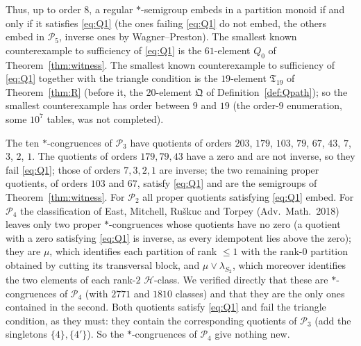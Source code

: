 \documentclass[11pt]{amsart}
\theoremstyle{definition}
\newcommand{\Hh}{\mathcal{H}}
\renewcommand{\P}{\mathcal{P}}
\begin{document}
Thus, up to order $8$, a regular $*$-semigroup embeds in a partition monoid if and only if it satisfies \eqref{eq:Q1} (the ones failing \eqref{eq:Q1} do not embed, the others embed in $\P_5$, inverse ones by Wagner--Preston). The smallest known counterexample to sufficiency of \eqref{eq:Q1} is the $61$-element $Q_0$ of Theorem~\ref{thm:witness}. The smallest known counterexample to sufficiency of \eqref{eq:Q1} together with the triangle condition is the $19$-element $\mathfrak T_{19}$ of Theorem~\ref{thm:R} (before it, the $20$-element $\mathfrak Q$ of Definition~\ref{def:Qpath}); so the smallest counterexample has order between $9$ and $19$ (the order-$9$ enumeration, some $10^7$ tables, was not completed).

The ten $*$-congruences of $\P_3$ have quotients of orders $203$, $179$, $103$, $79$, $67$, $43$, $7$, $3$, $2$, $1$. The quotients of orders $179,79,43$ have a zero and are not inverse, so they fail \eqref{eq:Q1}; those of orders $7,3,2,1$ are inverse; the two remaining proper quotients, of orders $103$ and $67$, satisfy \eqref{eq:Q1} and are the semigroups of Theorem~\ref{thm:witness}. For $\P_2$ all proper quotients satisfying \eqref{eq:Q1} embed. For $\P_4$ the classification of East, Mitchell, Ru\v skuc and Torpey (Adv.\ Math.\ 2018) leaves only two proper $*$-congruences whose quotients have no zero (a quotient with a zero satisfying \eqref{eq:Q1} is inverse, as every idempotent lies above the zero); they are $\mu$, which identifies each partition of rank $\le1$ with the rank-$0$ partition obtained by cutting its transversal block, and $\mu\vee\lambda_{S_2}$, which moreover identifies the two elements of each rank-$2$ $\Hh$-class. We verified directly that these are $*$-congruences of $\P_4$ (with $2771$ and $1810$ classes) and that they are the only ones contained in the second. Both quotients satisfy \eqref{eq:Q1} and fail the triangle condition, as they must: they contain the corresponding quotients of $\P_3$ (add the singletons $\{4\},\{4'\}$). So the $*$-congruences of $\P_4$ give nothing new.
\end{document}
